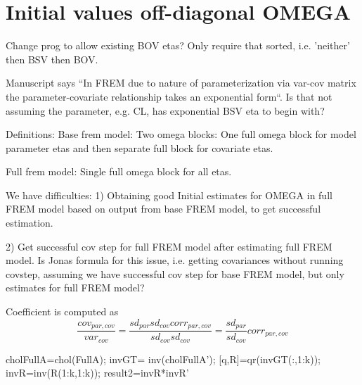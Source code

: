 \section{Initial values off-diagonal OMEGA}

Change prog to allow existing BOV etas? Only require that sorted, i.e. 'neither' then BSV then BOV.


Manuscript says ``In FREM due to nature of parameterization via var-cov matrix the parameter-covariate
relationship
takes an exponential form``. Is that not assuming the parameter, e.g. CL, has exponential BSV eta to begin with?

Definitions:
Base frem model: Two omega blocks: One full omega block for model parameter etas and then separate full block for
covariate etas.

Full frem model: Single full omega block for all etas.

We have difficulties:
1) Obtaining good Initial estimates for OMEGA in full FREM model based on output from base FREM model,
to get successful estimation.

2) Get successful cov step for full FREM model after estimating full FREM model.
Is Jonas formula for this issue, i.e. getting covariances without running covstep, assuming we have
successful cov step for base FREM model, but only estimates for full FREM model?


Coefficient is computed as
\[
\frac{cov_{par,cov}}{var_{cov}}=\frac{sd_{par}sd_{cov}corr_{par,cov}}{sd_{cov}sd_{cov}}=\frac{sd_{par}}{sd_{cov}}corr_{par,cov}
\]



  cholFullA=chol(FullA);
invGT=  inv(cholFullA'); %
[q,R]=qr(invGT(:,1:k));
invR=inv(R(1:k,1:k));
result2=invR*invR' 
